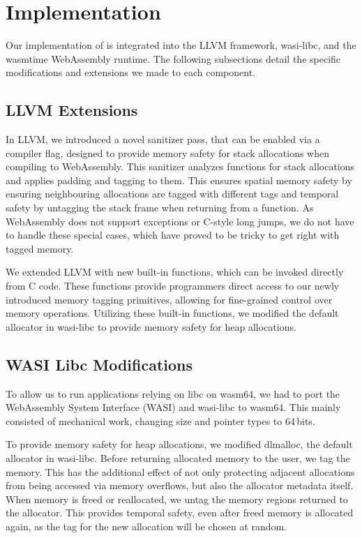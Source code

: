 \chapter{Implementation}
\label{ch:implementation}

Our implementation of \projectname{} is integrated into the LLVM framework, wasi-libc, and the wasmtime WebAssembly runtime.
The following subsections detail the specific modifications and extensions we made to each component.

\section{LLVM Extensions}
\label{sec:llvm}

In LLVM, we introduced a novel sanitizer pass, that can be enabled via a compiler flag, designed to provide memory safety for stack allocations when compiling to WebAssembly.
This sanitizer analyzes functions for stack allocations and applies padding and tagging to them.
This ensures spatial memory safety by ensuring neighbouring allocations are tagged with different tags and temporal safety by untagging the stack frame when returning from a function.
As WebAssembly does not support exceptions or C-style long jumps, we do not have to handle these special cases, which have proved to be tricky to get right with tagged memory.

We extended LLVM with new built-in functions, which can be invoked directly from C code.
These functions provide programmers direct access to our newly introduced memory tagging primitives, allowing for fine-grained control over memory operations.
Utilizing these built-in functions, we modified the default allocator in wasi-libc to provide memory safety for heap allocations.

\section{WASI Libc Modifications}
\label{sec:wasi-libc}

To allow us to run applications relying on libc on wasm64, we had to port the WebAssembly System Interface (WASI) and wasi-libc to wasm64.
This mainly consisted of mechanical work, changing size and pointer types to 64\,bits.

To provide memory safety for heap allocations, we modified dlmalloc, the default allocator in wasi-libc.
Before returning allocated memory to the user, we tag the memory.
This has the additional effect of not only protecting adjacent allocations from being accessed via memory overflows, but also the allocator metadata itself.
When memory is freed or reallocated, we untag the memory regions returned to the allocator.
This provides temporal safety, even after freed memory is allocated again, as the tag for the new allocation will be chosen at random.

